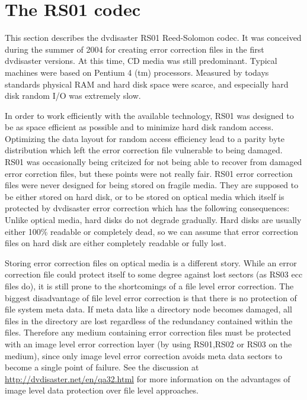 \newpage
\section{The RS01 codec}
\label{rs01}
This section describes the dvdisaster RS01 Reed-Solomon codec. 
It was conceived during the summer of 2004 for creating 
error correction files in the first dvdisaster versions.
At this time, CD media was still predominant. 
Typical machines were based on Pentium 4 (tm) processors.
Measured by todays standards physical RAM and hard disk
space were scarce, and especially hard disk random I/O
was extremely slow. 

\smallskip

In order to work efficiently with the available technology,
RS01 was designed to be as space efficient as possible 
and to minimize hard disk random access. 
Optimizing the data layout for random access efficiency
lead to a parity byte distribution which left the error correction
file vulnerable to being damaged. RS01 was 
occasionally being critcized for not being able to recover 
from damaged error corrction files, but these points
were not really fair. RS01 error correction
files were never designed for being stored on fragile
media. They are supposed to
be either stored on hard disk, or to be stored on optical
media which itself is protected by dvdisaster error
correction which has the following consequences:
 Unlike optical media, hard disks do not degrade
gradually. Hard disks are usually either 100\% readable or 
completely dead, so we can assume that error correction
files on hard disk are either completely readable or fully lost.

Storing error correction files on optical media is a different
story. While an error correction file could protect itself to some
degree against lost sectors (as RS03 ecc files do), it is still
prone to the shortcomings of a file level error correction. 
The biggest disadvantage of file level error correction is
that there is no protection of file system meta data.
If meta data like a directory node becomes damaged, all files
in the directory are lost regardless of the redundancy contained
within the files. Therefore any medium containing error 
correction files must be protected with an image level
error correction layer (by using RS01,RS02 or RS03 on the medium), 
since only image level error correction avoids meta 
data sectors to become a single point of failure. See the
discussion at \url{http://dvdisaster.net/en/qa32.html} for
more information on the advantages of image level data protection
over file level approaches.

